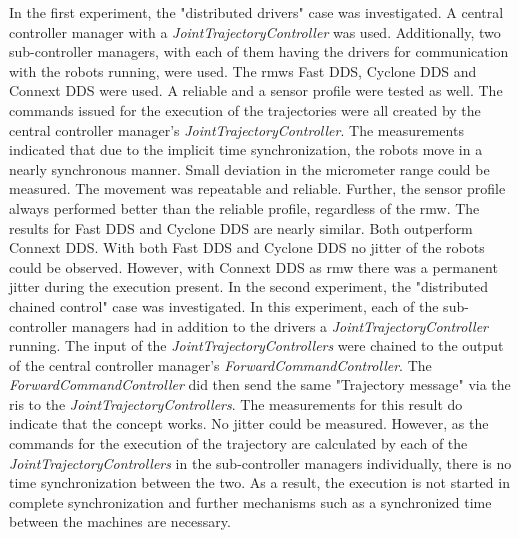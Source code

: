In the first experiment, the "distributed drivers" case was investigated. A central controller manager with a \textit{JointTrajectoryController} was used. Additionally, two sub-controller managers, with each of them having the drivers for communication with the robots running, were used. The \glspl{rmw} Fast DDS, Cyclone DDS and Connext DDS were used. A reliable and a sensor profile were tested as well. The commands issued for the execution of the trajectories were all created by the central controller manager's \textit{JointTrajectoryController}. The measurements indicated that due to the implicit time synchronization, the robots move in a nearly synchronous manner. Small deviation in the micrometer range could be measured. The movement was repeatable and reliable. Further, the sensor profile always performed better than the reliable profile, regardless of the \gls{rmw}. The results for Fast DDS and Cyclone DDS are nearly similar. Both outperform Connext DDS. With both Fast DDS and Cyclone DDS no jitter of the robots could be observed. However, with Connext DDS as \gls{rmw} there was a permanent jitter during the execution present.\newline
In the second experiment, the "distributed chained control" case was investigated. In this experiment, each of the sub-controller managers had in addition to the drivers a \textit{JointTrajectoryController} running. The input of the \textit{JointTrajectoryControllers} were chained to the output of the central controller manager's \textit{ForwardCommandController}. The \textit{ForwardCommandController} did then send the same  "Trajectory message" via the \glspl{ri} to the \textit{JointTrajectoryControllers}. The measurements for this result do indicate that the concept works. No jitter could be measured. However, as the commands for the execution of the trajectory are calculated by each of the \textit{JointTrajectoryControllers} in the sub-controller managers individually, there is no time synchronization between the two. As a result, the execution is not started in complete synchronization and further mechanisms such as a synchronized time between the machines are necessary.

